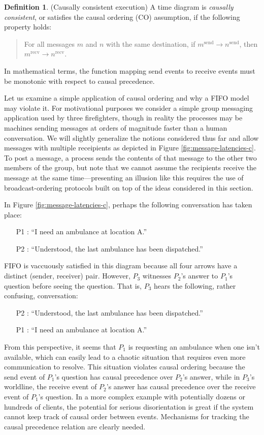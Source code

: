 \documentclass[]             %
{NASA}                       %
\theoremstyle{definition}
\newtheorem{definition}{Definition}[section]
\begin{document}
\begin{definition}(Causally consistent execution)
  A time diagram is \emph{causally consistent}, or satisfies the
  causal ordering (CO) assumption, if the following property holds:
  \begin{quote}
  For all messages $m$ and $n$ with the same destination, if
  $m^\textrm{send} \to n^\textrm{send}$, then $m^\textrm{recv} \to
  n^\textrm{recv}$.
  \end{quote}
  In mathematical terms, the function mapping send events to receive
  events must be monotonic with respect to causal precedence.
\end{definition}

Let us examine a simple application of causal ordering and why a FIFO
model may violate it. For motivational purposes we consider a simple
group messaging application used by three firefighters, though in
reality the processes may be machines sending messages at orders of
magnitude faster than a human conversation. We will slightly
generalize the notions considered thus far and allow messages with
multiple receipients as depicted in Figure
\ref{fig:message-latencies-c}. To post a message, a process sends the
contents of that message to the other two members of the group, but
note that we cannot assume the recipients receive the message at the
same time---presenting an illusion like this requires the use of
broadcast-ordering protocols built on top of the ideas considered in
this section.

In Figure \ref{fig:message-latencies-c}, perhaps the following
conversation has taken place:
\begin{itemize}
\item [P1]: ``I need an ambulance at location A.''
\item [P2]: ``Understood, the last ambulance has been dispatched.''
\end{itemize}
FIFO is vaccuously satisfied in this diagram because all four arrows
have a distinct (sender, receiver) pair. However, $P_3$ witnesses
$P_2$'s answer to $P_1$'s question before seeing the question. That
is, $P_3$ hears the following, rather confusing, conversation:
\begin{itemize}
\item [P2]: ``Understood, the last ambulance has been dispatched.''
\item [P1]: ``I need an ambulance at location A.''
\end{itemize}
From this perspective, it seems that $P_1$ is requesting an ambulance
when one isn't available, which can easily lead to a chaotic situation
that requires even more communication to resolve. This situation
violates causal ordering because the send event of $P_1$'s question
has causal precedence over $P_2$'s answer, while in $P_3$'s worldline,
the receive event of $P_2$'s answer has causal precedence over the
receive event of $P_1$'s question. In a more complex example with
potentially dozens or hundreds of clients, the potential for serious
disorientation is great if the system cannot keep track of causal
order between events. Mechanisms for tracking the causal precedence
relation are clearly needed.
\end{document}
